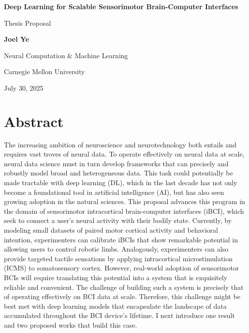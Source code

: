 \documentclass[12pt,oneside]{report}
\newcommand{\proposaltitle}{Deep Learning for Scalable Sensorimotor Brain-Computer Interfaces}
\newcommand{\authorname}{\textbf{Joel Ye}}
\newcommand{\department}{Neural Computation \& Machine Learning}
\newcommand{\university}{Carnegie Mellon University}
\newcommand{\proposaldate}{July 30, 2025}
\begin{document}
\begin{titlepage}
  \centering
  {\LARGE \textbf{\proposaltitle}\par}
  \vspace{1em}
  {\Large Thesis Proposal\par}
  \vspace{2em}
  {\large \authorname\par}
  \vfill
  {\large \department\par}
  {\large \university\par}
  {\large \proposaldate\par}
\end{titlepage}


\section*{Abstract}
The increasing ambition of neuroscience and neurotechnology both entails and requires vast troves of neural data. To operate effectively on neural data at scale, neural data science must in turn develop frameworks that can precisely and robustly model broad and heterogeneous data. This task could potentially be made tractable with deep learning (DL), which in the last decade has not only become a foundational tool in artificial intelligence (AI), but has also seen growing adoption in the natural sciences. This proposal advances this program in the domain of sensorimotor intracortical brain-computer interfaces (iBCI), which seek to connect a user’s neural activity with their bodily state. Currently, by modeling small datasets of paired motor cortical activity and behavioral intention, experimenters can calibrate iBCIs that show remarkable potential in allowing users to control robotic limbs. Analogously, experimenters can also provide targeted tactile sensations by applying intracortical microstimulation (ICMS) to somatosensory cortex. However, real-world adoption of sensorimotor BCIs will require translating this potential into a system that is exquisitely reliable and convenient.
The challenge of building such a system is precisely that of operating effectively on BCI data at scale.
Therefore, this challenge might be best met with deep learning models that encapsulate the landscape of data accumulated throughout the BCI device's lifetime.
I next introduce one result and two proposed works that build this case.
\end{document}
